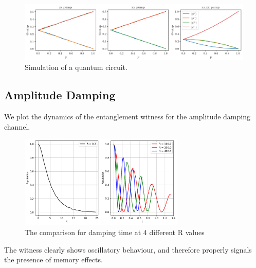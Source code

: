 \documentclass[12pt]{article}
\begin{document}
  \begin{figure}[h]
    \centering
    \includegraphics[width=\textwidth]{images/reservoir-engineering-simulation}
    \caption{Simulation of a quantum circuit.%
      \label{fig:reservoir-engineering-simulation}}
  \end{figure}
  \subsection{Amplitude Damping}
  We plot the dynamics of the entanglement witness for the amplitude damping channel.
  
  \begin{figure}[h]
    \centering
    \includegraphics[width=0.7\textwidth]{images/amplitude_damping_population_non_markovianity}
    \caption{The comparison for damping time at 4 different R values %
            \label{fig:amplitude_damping_population}}
  \end{figure}

  The witness clearly shows oscillatory behaviour, and therefore properly signals the presence of memory effects.


  \printbibliography
\end{document}
